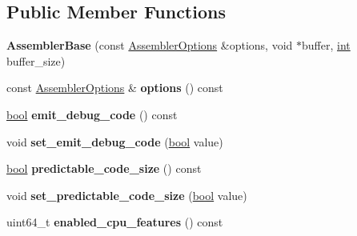 \subsection*{Public Member Functions}
\begin{DoxyCompactItemize}
\item 
\mbox{\label{classv8_1_1internal_1_1AssemblerBase_a386123cd7232eb682bda12e8e20171a7}} 
{\bfseries Assembler\+Base} (const \mbox{\hyperlink{structv8_1_1internal_1_1AssemblerOptions}{Assembler\+Options}} \&options, void $\ast$buffer, \mbox{\hyperlink{classint}{int}} buffer\+\_\+size)
\item 
\mbox{\label{classv8_1_1internal_1_1AssemblerBase_a0658734b4ed4c8c50a5c06c9a9c7c3c9}} 
const \mbox{\hyperlink{structv8_1_1internal_1_1AssemblerOptions}{Assembler\+Options}} \& {\bfseries options} () const
\item 
\mbox{\label{classv8_1_1internal_1_1AssemblerBase_aeb2c15db71d05cbe8ecc8e5377f19ac5}} 
\mbox{\hyperlink{classbool}{bool}} {\bfseries emit\+\_\+debug\+\_\+code} () const
\item 
\mbox{\label{classv8_1_1internal_1_1AssemblerBase_a1bcbeda264b5026c463490820c91ffab}} 
void {\bfseries set\+\_\+emit\+\_\+debug\+\_\+code} (\mbox{\hyperlink{classbool}{bool}} value)
\item 
\mbox{\label{classv8_1_1internal_1_1AssemblerBase_aa9f455da0ddc6b3b115e907d6b555614}} 
\mbox{\hyperlink{classbool}{bool}} {\bfseries predictable\+\_\+code\+\_\+size} () const
\item 
\mbox{\label{classv8_1_1internal_1_1AssemblerBase_a8fb65d4cafef633546c2143aac9d090d}} 
void {\bfseries set\+\_\+predictable\+\_\+code\+\_\+size} (\mbox{\hyperlink{classbool}{bool}} value)
\item 
\mbox{\label{classv8_1_1internal_1_1AssemblerBase_a9b7a9ea148a2233c359a1733fb67a1f7}} 
uint64\+\_\+t {\bfseries enabled\+\_\+cpu\+\_\+features} () const
\item 
\mbox{\label{classv8_1_1internal_1_1AssemblerBase_a042d7907d4097ff5f4bc4cb0685b47a7}} 

\end{DoxyCompactItemize}
